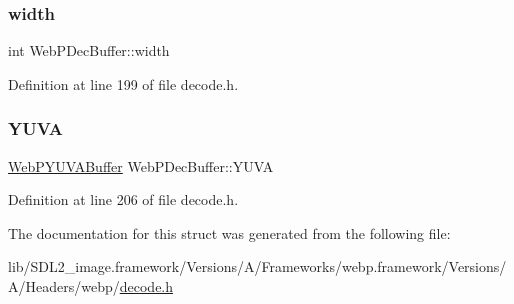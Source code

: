 \mbox{\label{struct_web_p_dec_buffer_ad60ebb8cce8580d92351c7aefd594e67}} 
\subsubsection{\texorpdfstring{width}{width}}
{\footnotesize\ttfamily int Web\+P\+Dec\+Buffer\+::width}



Definition at line 199 of file decode.\+h.

\mbox{\label{struct_web_p_dec_buffer_ac1d34dcf712341af78858ae5f5d16260}} 
\subsubsection{\texorpdfstring{YUVA}{YUVA}}
{\footnotesize\ttfamily \mbox{\hyperlink{struct_web_p_y_u_v_a_buffer}{Web\+P\+Y\+U\+V\+A\+Buffer}} Web\+P\+Dec\+Buffer\+::\+Y\+U\+VA}



Definition at line 206 of file decode.\+h.



The documentation for this struct was generated from the following file\+:\begin{DoxyCompactItemize}
\item 
lib/\+S\+D\+L2\+\_\+image.\+framework/\+Versions/\+A/\+Frameworks/webp.\+framework/\+Versions/\+A/\+Headers/webp/\mbox{\hyperlink{decode_8h}{decode.\+h}}\end{DoxyCompactItemize}
